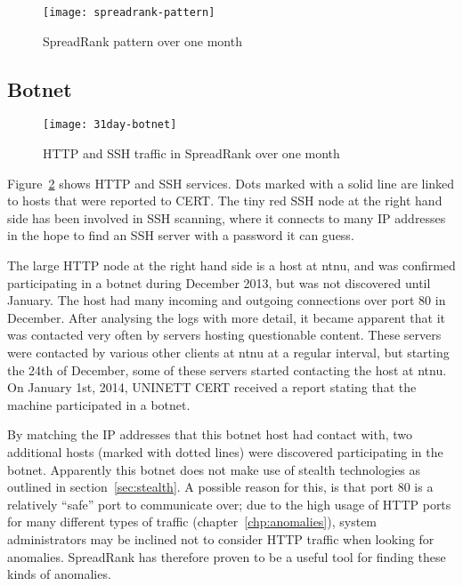 \begin{figure}[h]
	\caption{SpreadRank pattern over one month}
	\label{fig:spreadrank-pattern}
	\centering
		\texttt{[image: spreadrank-pattern]}
\end{figure}

\subsection{Botnet}
\label{ssec:botnet}

\begin{figure}[h]
	\caption{HTTP and SSH traffic in SpreadRank over one month}
	\label{fig:31day-botnet}
	\centering
		\texttt{[image: 31day-botnet]}
\end{figure}

Figure~\ref{fig:31day-botnet} shows \gls{HTTP} and \gls{SSH} services.
Dots marked with a solid line are linked to hosts that were reported to CERT.
The tiny red SSH node at the right hand side has been involved in \gls{SSH} scanning,
 where it connects to many IP addresses in the hope to find an SSH server with a password it can guess.

The large HTTP node at the right hand side is a host at \gls{ntnu}, and was confirmed participating in a botnet during December 2013,
 but was not discovered until January.
The host had many incoming and outgoing connections over port 80 in December.
After analysing the logs with more detail, it became apparent that it was contacted very often by servers hosting questionable content.
These servers were contacted by various other clients at \gls{ntnu} at a regular interval,
 but starting the 24th of December, some of these servers started contacting the host at \gls{ntnu}.
On January 1st, 2014, UNINETT CERT received a report stating that the machine participated in a botnet.

By matching the IP addresses that this botnet host had contact with,
 two additional hosts (marked with dotted lines) were discovered participating in the botnet.
Apparently this botnet does not make use of stealth technologies as outlined in section~\ref{sec:stealth}.
A possible reason for this, is that port 80 is a relatively ``safe'' port to communicate over;
 due to the high usage of HTTP ports for many different types of traffic (chapter~\ref{chp:anomalies}),
 system administrators may be inclined not to consider HTTP traffic when looking for anomalies.
SpreadRank has therefore proven to be a useful tool for finding these kinds of anomalies.

